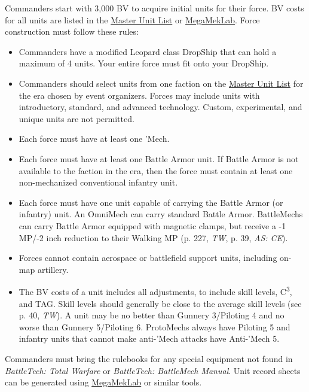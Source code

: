 Commanders start with 3,000 BV to acquire initial units for their force.
BV costs for all units are listed in the \href{http://www.masterunitlist.info}{Master Unit List} or \href{https://megamek.org}{MegaMekLab}.
Force construction must follow these rules:

\begin{itemize}

\item Commanders have a modified Leopard class DropShip that can hold a maximum of 4 units.
Your entire force must fit onto your DropShip.

\item Commanders should select units from one faction on the \href{http://www.masterunitlist.info/}{Master Unit List} for the era chosen by event organizers.
Forces may include units with introductory, standard, and advanced technology.
Custom, experimental, and unique units are not permitted.

\item Each force must have at least one 'Mech.

\item Each force must have at least one Battle Armor unit.
If Battle Armor is not available to the faction in the era, then the force must contain at least one non-mechanized conventional infantry unit.

\item Each force must have one unit capable of carrying the Battle Armor (or infantry) unit.
An OmniMech can carry standard Battle Armor.
BattleMechs can carry Battle Armor equipped with magnetic clamps, but receive a -1 MP/-2 inch reduction to their Walking MP (p. 227, \emph{TW}, p. 39, \emph{AS: CE}).

\item Forces cannot contain aerospace or battlefield support units, including on-map artillery.

\item The BV costs of a unit includes all adjustments, to include skill levels, C\textsuperscript{3}, and TAG.
Skill levels should generally be close to the average skill levels (see p. 40, \emph{TW}).
A unit may be no better than Gunnery 3/Piloting 4 and no worse than Gunnery 5/Piloting 6.
ProtoMechs always have Piloting 5 and infantry units that cannot make anti-'Mech attacks have Anti-'Mech 5.

\end{itemize}

Commanders must bring the rulebooks for any special equipment not found in \emph{BattleTech: Total Warfare} or \emph{BattleTech: BattleMech Manual}.
Unit record sheets can be generated using \href{https://megamek.org}{MegaMekLab} or similar tools.

